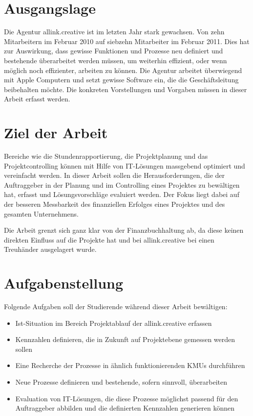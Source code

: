 \section{Ausgangslage}
Die Agentur allink.creative ist im letzten Jahr stark gewachsen. Von zehn
Mitarbeitern im Februar 2010 auf siebzehn Mitarbeiter im Februar 2011. Dies hat 
zur Auswirkung, dass gewisse Funktionen und Prozesse neu definiert und bestehende
überarbeitet werden müssen, um weiterhin effizient, oder wenn möglich noch 
effizienter, arbeiten zu können. Die Agentur arbeitet überwiegend mit Apple
Computern und setzt gewisse Software ein, die die Geschäftsleitung beibehalten 
möchte. Die konkreten Vorstellungen und Vorgaben müssen in dieser Arbeit erfasst 
werden.

\section{Ziel der Arbeit}
Bereiche wie die Stundenrapportierung, die Projektplanung und das Projektcontrolling 
können mit Hilfe von IT-Lösungen massgebend optimiert und vereinfacht werden. 
In dieser Arbeit sollen die Herausforderungen, die der Auftraggeber in der 
Planung und im Controlling eines Projektes zu bewältigen hat, erfasst und 
Lösungsvorschläge evaluiert werden. Der Fokus liegt dabei auf der besseren 
Messbarkeit des finanziellen Erfolges eines Projektes und des gesamten 
Unternehmens.

Die Arbeit grenzt sich ganz klar von der Finanzbuchhaltung ab, da
diese keinen direkten Einfluss auf die Projekte hat und bei allink.creative 
bei einen Treuhänder ausgelagert wurde.

\section{Aufgabenstellung}
Folgende Aufgaben soll der Studierende während dieser Arbeit bewältigen:

\begin{itemize}
    \item Ist-Situation im Bereich Projektablauf der allink.creative erfassen
    \item Kennzahlen definieren, die in Zukunft auf Projektebene gemessen 
        werden sollen
    \item Eine Recherche der Prozesse in ähnlich funktionierenden KMUs durchführen
    \item Neue Prozesse definieren und bestehende, sofern sinnvoll, überarbeiten
    \item Evaluation von IT-Lösungen, die diese Prozesse möglichst passend 
        für den Auftraggeber abbilden und die definierten Kennzahlen generieren können
\end{itemize}


